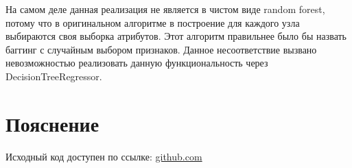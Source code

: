 \documentclass{article} %
\begin{document}
На самом деле данная реализация
не является в чистом виде random forest,
потому что в оригинальном алгоритме
в построение для каждого узла выбираются
своя выборка атрибутов.
Этот алгоритм правильнее было бы назвать
баггинг с случайным выбором признаков.
Данное несоответствие вызвано
невозможностью реализовать данную функциональность
через DecisionTreeRegressor.

\section{Пояснение}
Исходный код доступен по ссылке:
\href{https://github.com/SvichkarevAnatoly/Course-Python-Bioinformatics/tree/master/semester2/task9}
{github.com}
\end{document}

